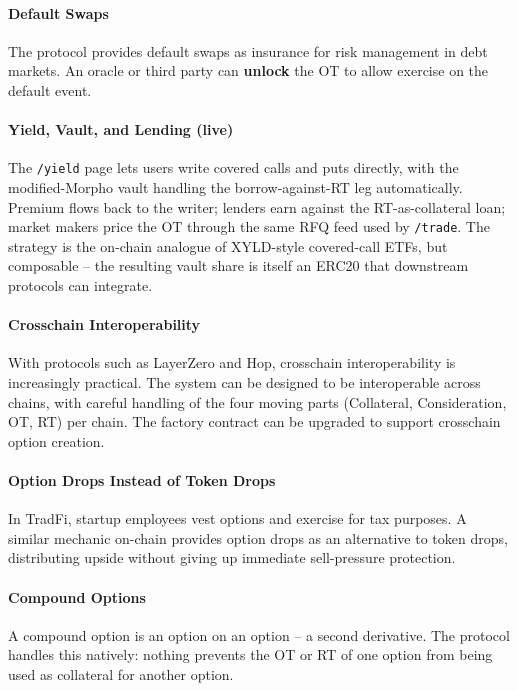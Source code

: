 \documentclass[%
 reprint,
 amsmath,amssymb,
 aps,
 prl,
floatfix,
]{revtex4-2}
\begin{document}
\paragraph*{Default Swaps}
The protocol provides default swaps as insurance for risk management in debt markets.
An oracle or third party can \textbf{unlock} the OT to allow exercise on the
default event.

\paragraph*{Yield, Vault, and Lending (live)}
The \texttt{/yield} page lets users write covered calls and puts directly, with the
modified-Morpho vault handling the borrow-against-RT leg automatically. Premium
flows back to the writer; lenders earn against the RT-as-collateral loan; market
makers price the OT through the same RFQ feed used by \texttt{/trade}. The strategy
is the on-chain analogue of XYLD-style covered-call ETFs, but composable -- the
resulting vault share is itself an ERC20 that downstream protocols can integrate.

\paragraph*{Crosschain Interoperability}
With protocols such as LayerZero and Hop, crosschain interoperability is increasingly
practical. The system can be designed to be interoperable across chains, with careful
handling of the four moving parts (Collateral, Consideration, OT, RT) per chain.
The factory contract can be upgraded to support crosschain option creation.

\paragraph*{Option Drops Instead of Token Drops}
In TradFi, startup employees vest options and exercise for tax purposes. A similar
mechanic on-chain provides option drops as an alternative to token drops, distributing
upside without giving up immediate sell-pressure protection.

\paragraph*{Compound Options}
A compound option is an option on an option -- a second derivative. The protocol
handles this natively: nothing prevents the OT or RT of one option from being used
as collateral for another option.
\end{document}
